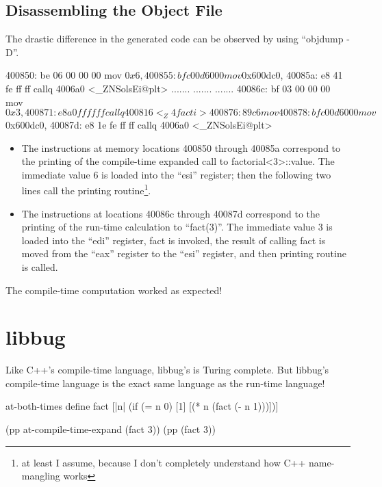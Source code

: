  \subsection{Disassembling the Object File}
 The drastic difference in the generated code can be observed by using ``objdump -D''.

 \begin{code}
 400850: be 06 00 00 00   mov    $0x6,%
 400855: bf c0 0d 60 00   mov    $0x600dc0,%
 40085a: e8 41 fe ff ff   callq  4006a0 <_ZNSolsEi@plt>
 .......
 .......
 .......
 40086c: bf 03 00 00 00   mov    $0x3,%
 400871: e8 a0 ff ff ff   callq  400816 <_Z4facti>
 400876: 89 c6            mov    %
 400878: bf c0 0d 60 00   mov    $0x600dc0,%
 40087d: e8 1e fe ff ff   callq  4006a0 <_ZNSolsEi@plt>
 \end{code}

 \begin{itemize}
   \item
 The instructions at memory locations 400850 through 40085a correspond to the
 printing of the compile-time expanded call to factorial\textless3\textgreater::value.
 The immediate value 6 is loaded into the ``esi'' register; then the following
 two lines call the printing routine\footnote{at least I assume, because
 I don't completely understand how C++ name-mangling works}.
   \item
 The instructions at locations 40086c through 40087d correspond to the
 printing of the run-time calculation to ``fact(3)''.  The immediate value 3
 is loaded into the ``edi'' register, fact is invoked, the result of
 calling fact is moved from the ``eax'' register to the ``esi'' register, and then
 printing routine is called.

 \end{itemize}
 The compile-time computation worked as expected!

 \section{libbug}
 Like C++'s compile-time language, libbug's is Turing complete.  But libbug's compile-time
 language is the exact same language as the run-time language!

 \begin{code}
 {at-both-times
  {define fact
    [|n| (if (= n 0)
             [1]
             [(* n (fact (- n 1)))])]}}

 (pp {at-compile-time-expand (fact 3)})
 (pp (fact 3))
 \end{code}

